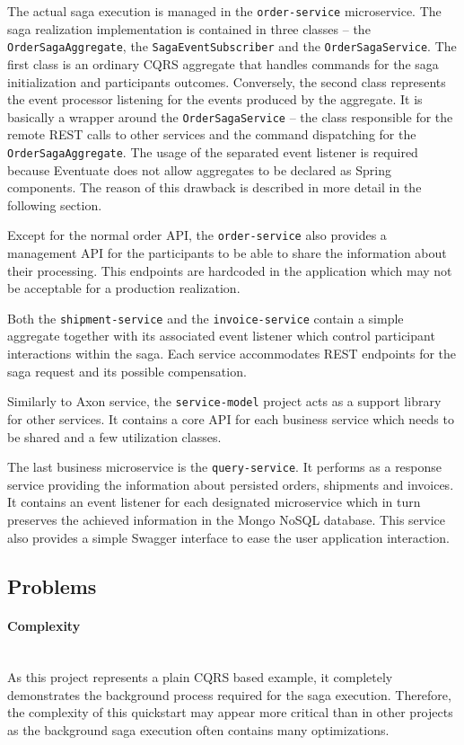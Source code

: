 \documentclass[oneside,
  digital, %
  table,   %
  lof,     %
  lot,     %
]{fithesis3}
\newcommand{\newlinepar}[1]{\paragraph{#1}\needspace{4\baselineskip}\mbox{}\\}
\begin{document}
The actual saga execution is managed in the \texttt{order-service} microservice. The saga realization implementation is contained in three classes -- the \texttt{OrderSagaAggregate}, the \texttt{SagaEventSubscriber} and the \texttt{OrderSagaService}. The first class is an ordinary CQRS aggregate that handles commands for the saga initialization and participants outcomes. Conversely, the second class represents the event processor listening for the events produced by the aggregate. It is basically a wrapper around the \texttt{OrderSagaService} -- the class responsible for the remote REST calls to other services and the command dispatching for the \texttt{OrderSagaAggregate}. The usage of the separated event listener is required because Eventuate does not allow aggregates to be declared as Spring components. The reason of this drawback is described in more detail in the following section.

Except for the normal order API, the \texttt{order-service} also provides a management API for the participants to be able to share the information about their processing. This endpoints are hardcoded in the application which may not be acceptable for a production realization.

Both the \texttt{shipment-service} and the \texttt{invoice-service} contain a simple aggregate together with its associated event listener which control participant interactions within the saga. Each service accommodates REST endpoints for the saga request and its possible compensation.

Similarly to Axon service, the \texttt{service-model} project acts as a support library for other services. It contains a core API for each business service which needs to be shared and a few utilization classes.

The last business microservice is the \texttt{query-service}. It performs as a response service providing the information about persisted orders, shipments and invoices. It contains an event listener for each designated microservice which in turn preserves the achieved information in the Mongo NoSQL database. This service also provides a simple Swagger interface to ease the user application interaction.

\subsection{Problems}

\newlinepar{Complexity}

As this project represents a plain CQRS based example, it completely demonstrates the background process required for the saga execution. Therefore, the complexity of this quickstart may appear more critical than in other projects as the background saga execution often contains many optimizations.
\end{document}
